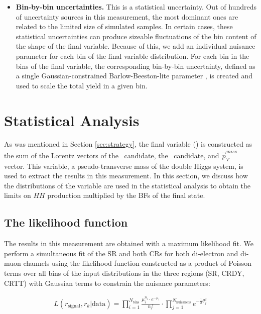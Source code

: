 \begin{itemize}
\item{\bf Bin-by-bin uncertainties.} 
This is a statistical uncertainty. Out of hundreds of uncertainty sources in this measurement, the most dominant ones are related to the limited size of simulated samples. In certain cases, these statistical uncertainties can produce sizeable fluctuations of the bin content of the shape of the final variable. Because of this, we add an individual nuisance parameter for each bin of the final variable distribution. For each bin in the bins of the final variable, the corresponding bin-by-bin uncertainty, defined as a single Gaussian-constrained Barlow-Beeston-lite parameter \cite{Barlow-Beeston, autoMCStats}, is created and used to scale the total yield in a given bin.

\end{itemize}

\section{Statistical Analysis}
\label{sec:statistics}

As was mentioned in Section \ref{sec:strategy}, the final variable (\mTHH) is constructed as the sum of the Lorentz vectors of the \Zll ~candidate, the \HBB~candidate, and $\vec{p}^{miss}_T$ vector. This variable, a pseudo-transverse mass of the double Higgs system, is used to extract the results in this measurement. In this section, we discuss how the distributions of the \mTHH variable are used in the statistical analysis to obtain the limits on $HH$ production multiplied by the BFs of the final state.

\subsection{The likelihood function}
\label{sec:likelihood}

The results in this measurement are obtained with a maximum likelihood fit. We perform a simultaneous fit of the SR and both CRs for both di-electron and di-muon channels using the likelihood function constructed as a product of Poisson terms over all bins of the input \mTHH distributions in the three regions (SR, CRDY, CRTT) with Gaussian terms to constrain the nuisance parameters:

\begin{align*}
L(r_{\text{signal}}, r_{k}|\text{data}) = \prod_{i=1}^{N_{\mathrm{bins}}}\frac{\mu_{i}^{n_{i}}\cdot e^{-\mu_{i}}}{n_{i}!}
\cdot \prod_{j=1}^{N_{\mathrm{nuisances}}} e^{-\frac{1}{2}\theta_{j}^{2}}
\end{align*}

